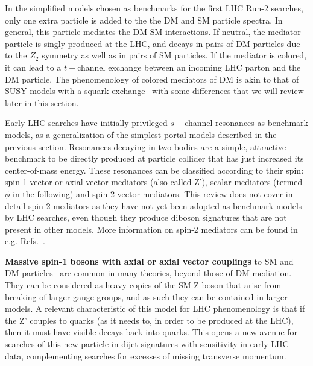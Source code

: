 \begin{marginnote}[]
\end{marginnote}

In the simplified models chosen as benchmarks for the first LHC Run-2 searches, only one extra particle is added to the the DM and SM particle spectra. In general, this particle mediates the DM-SM interactions. If neutral, the mediator particle is singly-produced at the LHC, and decays in pairs of DM particles due to the $Z_2$ symmetry as well as in pairs of SM particles. If the mediator is colored, it can lead to a $t-$channel exchange between an incoming LHC parton and the DM particle. The phenomenology of colored mediators of DM is akin to that of SUSY models with a squark exchange~\cite{Papucci:2014iwa,An:2013xka,Bell:2012rg} with some differences that we will review later in this section. 

Early LHC searches have initially privileged $s-$channel resonances as benchmark models, as a generalization of the simplest portal models described in the previous section. Resonances decaying in two bodies
are a simple, attractive benchmark to be directly produced at particle collider that has just increased its center-of-mass energy. These resonances can be classified according to their spin: spin-1 vector or axial vector mediators (also called Z'), scalar mediators (termed $\phi$ in the following) and spin-2 vector mediators. This review does not cover in detail spin-2 mediators as they have not yet been adopted as benchmark models by LHC searches, even though they produce diboson signatures that are not present in other models. More information on spin-2 mediators can be found in e.g. Refs.~\cite{Kraml:2017atm,Han:2015cty}.


\textbf{Massive spin-1 bosons with axial or axial vector couplings} to SM and DM particles~\cite{Shoemaker:2011vi} are common in many theories, beyond those of DM mediation. They can be considered as heavy copies of the SM Z boson that arise from breaking of larger gauge groups, and as such they can be contained in larger models. A relevant characteristic of this model for LHC phenomenology is that if the Z' couples to quarks (as it needs to, in order to be produced at the LHC), then it must have visible decays back into quarks. This opens a new avenue for searches of this new particle in dijet signatures with sensitivity in early LHC data, complementing searches for excesses of missing transverse momentum. 

